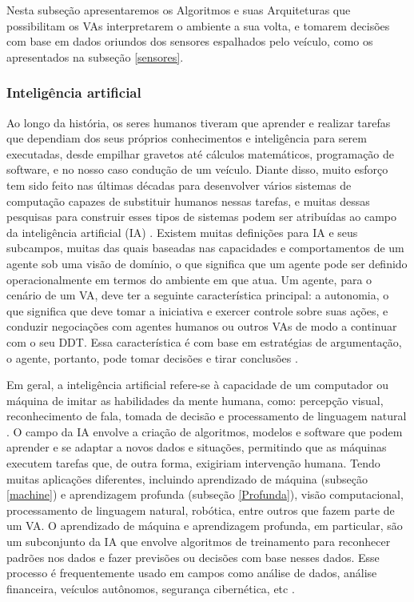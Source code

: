 Nesta subseção apresentaremos os Algoritmos e suas Arquiteturas que possibilitam os VAs interpretarem o ambiente a sua volta, e tomarem decisões com base em dados oriundos dos sensores espalhados pelo veículo, como os apresentados na subseção \ref{sensores}. 


\subsubsection{Inteligência artificial} \label{ia}

Ao longo da história, os seres humanos tiveram que aprender e realizar tarefas que dependiam dos seus próprios conhecimentos e inteligência para serem executadas, desde empilhar gravetos até cálculos matemáticos, programação de software, e no nosso caso condução de um veículo. Diante disso, muito esforço tem sido feito nas últimas décadas para desenvolver vários sistemas de computação capazes de substituir humanos nessas tarefas, e muitas dessas pesquisas para construir esses tipos de sistemas podem ser atribuídas ao campo da inteligência artificial (IA) \cite{caio}. 
Existem muitas definições para IA e seus subcampos, muitas das quais baseadas nas capacidades e comportamentos de um agente sob uma visão de domínio, o que significa que um agente pode ser definido operacionalmente em termos do ambiente em que atua.
Um agente, para o cenário de um VA, deve ter a seguinte característica principal: a autonomia, o que significa que deve tomar a iniciativa e exercer controle sobre suas ações, e conduzir negociações com agentes humanos ou outros VAs de modo a continuar com o seu DDT.
Essa característica é com base em estratégias de argumentação, o agente, portanto, pode tomar decisões e tirar conclusões \cite{software-ia}.

Em geral, a inteligência artificial refere-se à capacidade de um computador ou máquina de imitar as habilidades da mente humana, como: percepção visual, reconhecimento de fala, tomada de decisão e processamento de linguagem natural \cite{software-ia}. O campo da IA envolve a criação de algoritmos, modelos e software que podem aprender e se adaptar a novos dados e situações, permitindo que as máquinas executem tarefas que, de outra forma, exigiriam intervenção humana. Tendo muitas aplicações diferentes, incluindo aprendizado de máquina (subseção \ref{machine}) e aprendizagem profunda (subseção \ref{Profunda}), visão computacional, processamento de linguagem natural, robótica, entre outros que fazem parte de um VA. O aprendizado de máquina e aprendizagem profunda, em particular, são um subconjunto da IA que envolve algoritmos de treinamento para reconhecer padrões nos dados e fazer previsões ou decisões com base nesses dados. Esse processo é frequentemente usado em campos como análise de dados, análise financeira, veículos autônomos, segurança cibernética, etc \cite{software-review, software-cnn}.


